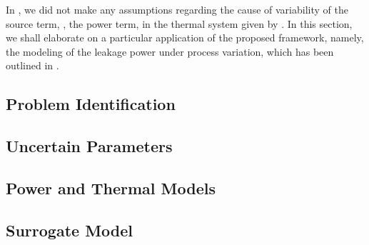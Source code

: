 In , we did not make any assumptions regarding the cause of variability of the source term, \ie, the power term, in the thermal system given by . In this section, we shall elaborate on a particular application of the proposed framework, namely, the modeling of the leakage power under process variation, which has been outlined in .

\subsection{Problem Identification} 


\subsection{Uncertain Parameters} 


\subsection{Power and Thermal Models}  


\subsection{Surrogate Model} 

